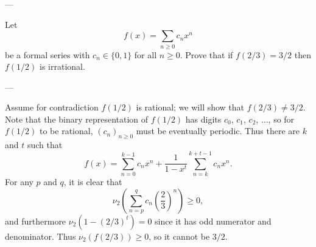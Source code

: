 
---

Let \[f(x)=\sum_{n\ge0}c_nx^n\]
be a formal series with $c_n\in\{0,1\}$ for all $n\ge0$. Prove that if $f(2/3)=3/2$ then $f(1/2)$ is irrational.

---

Assume for contradiction $f(1/2)$ is rational; we will show that $f(2/3)\ne3/2$. Note that the binary representation of $f(1/2)$ has digits $c_0$, $c_1$, $c_2$, $\ldots$, so for $f(1/2)$ to be rational, $(c_n)_{n\ge0}$ must be eventually periodic. Thus there are $k$ and $t$ such that \[f(x)=\sum_{n=0}^{k-1}c_nx^n+\frac1{1-x^t}\sum_{n=k}^{k+t-1}c_nx^n.\]
For any $p$ and $q$, it is clear that \[\nu_2\left(\sum_{n=p}^qc_n\left(\frac23\right)^n\right)\ge0,\]
and furthermore $\nu_2(1-(2/3)^t)=0$ since it has odd numerator and denominator. Thus $\nu_2(f(2/3))\ge0$, so it cannot be $3/2$.

